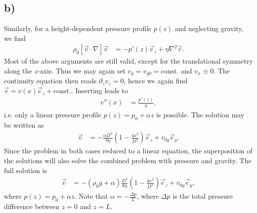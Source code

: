 \documentclass[english, parskip=full]{scrartcl}
\newcommand{\kla}{}
\newcommand{\tecxt}{}
\begin{document}
\subsection*{b)}
Similarly, for a height-dependent pressure profile $p(z)$ and neglecting gravity, we find
\begin{align}
\rho_0 [\vec{v}\cdot\nabla]\vec{v} &= -p'(z)\vec{e}_z + \eta \nabla^2\vec{v}.
\end{align}
Most of the above arguments are still valid, except for the translational symmetry along the $z$-axis.
Thus we may again set $v_y = v_{y0} = \tecxt\text{const.}$ and $v_x \equiv 0$.
The continuity equation then reads $\partial_zv_z = 0$, hence we again find $\vec{v} = v(x)\vec{e}_z + \tecxt\text{const.}$.
Inserting leads to
\begin{align}
v''(x) &= \frac{p'(z)}{\eta},
\end{align}
i.e. only a linear pressure profile $p(z) = p_0 + \alpha z$  is possible.
The solution may be written as
\begin{align}
\vec{v} &= -\frac{\alpha D^2}{8\eta} \kla\left( {1 - \frac{4x^2}{D^2}} \right) \vec{e}_z + v_{0y}\vec{e}_y.
\end{align}
Since the problem in both cases reduced to a linear equation, the superposition of the solutions will also solve the combined problem with pressure and gravity.
The full solution is
\begin{align}
\vec{v} &= -(\rho_0g + \alpha)\frac{D^2}{8\eta} \kla\left( {1 - \frac{4x^2}{D^2}} \right) \vec{e}_z + v_{0y}\vec{e}_y,
\end{align}
where $p(z) = p_0 + \alpha z$.
Note that $\alpha = -\frac{\Delta p}{L}$, where $\Delta p$ is the total pressure difference between $z=0$ and $z=L$.
\end{document}

